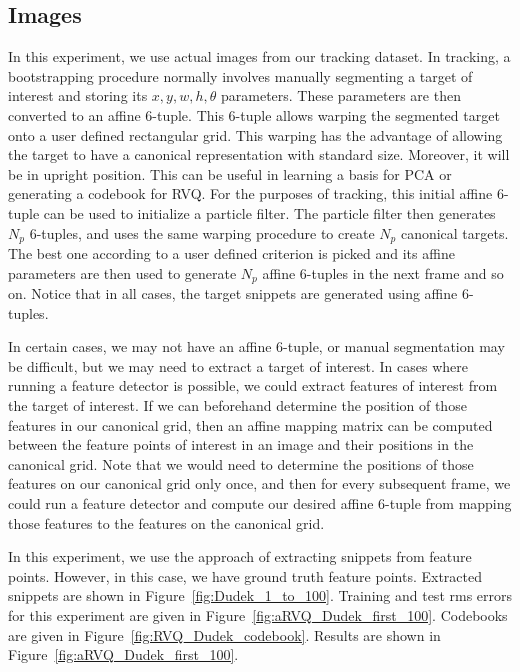 \subsection{Images}
In this experiment, we use actual images from our tracking dataset.  In tracking, a bootstrapping procedure normally involves manually segmenting a target of interest and storing its $x, y, w, h, \theta$ parameters.  These parameters are then converted to an affine 6-tuple.  This 6-tuple allows warping the segmented target onto a user defined rectangular grid.  This warping has the advantage of allowing the target to have a canonical representation with standard size.  Moreover, it will be in upright position.  This can be useful in learning a basis for PCA or generating a codebook for RVQ.  For the purposes of tracking, this initial affine 6-tuple can be used to initialize a particle filter.  The particle filter then generates $N_p$ 6-tuples, and uses the same warping procedure to create $N_p$ canonical targets.  The best one according to a user defined criterion is picked and its affine parameters are then used to generate $N_p$ affine 6-tuples in the next frame and so on.  Notice that in all cases, the target snippets are generated using affine 6-tuples.



In certain cases, we may not have an affine 6-tuple, or manual segmentation may be difficult, but we may need to extract a target of interest.  In cases where running a feature detector is possible, we could extract features of interest from the target of interest.  If we can beforehand determine the position of those features in our canonical grid, then an affine mapping matrix can be computed between the feature points of interest in an image and their positions in the canonical grid.  Note that we would need to determine the positions of those features on our canonical grid only once, and then for every subsequent frame, we could run a feature detector and compute our desired  affine 6-tuple from mapping those features to the features on the canonical grid.

In this experiment, we use the approach of extracting snippets from feature points.  However, in this case, we have ground truth feature points.  Extracted snippets are shown in Figure~\ref{fig:Dudek_1_to_100}.  Training and test rms errors for this experiment are given in Figure~\ref{fig:aRVQ_Dudek_first_100}.  Codebooks are given in Figure~\ref{fig:RVQ_Dudek_codebook}.  Results are shown in Figure~\ref{fig:aRVQ_Dudek_first_100}.




